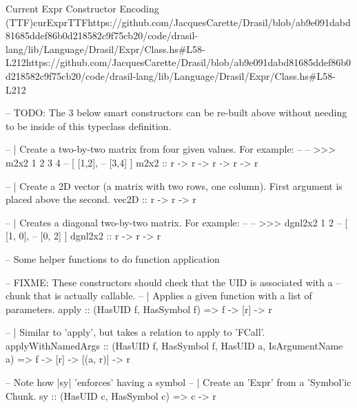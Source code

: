 \begin{haskell}{Current Expr Constructor Encoding (TTF)}{curExprTTF}{https://github.com/JacquesCarette/Drasil/blob/ab9e091dabd81685ddef86b0d218582c9f75c\newline{}b20/code/drasil-lang/lib/Language/Drasil/Expr/Class.hs\#L58-L212}{https://github.com/JacquesCarette/Drasil/blob/ab9e091dabd81685ddef86b0d218582c9f75cb20/code/drasil-lang/lib/Language/Drasil/Expr/Class.hs\#L58-L212}
  
  -- TODO: The 3 below smart constructors can be re-built above without needing to be inside of this typeclass definition.
  
  
  -- | Create a two-by-two matrix from four given values. For example:
  --
  -- >>> m2x2 1 2 3 4
  -- [ [1,2],
  --   [3,4] ]
  m2x2 :: r -> r -> r -> r -> r
  
  -- | Create a 2D vector (a matrix with two rows, one column). First argument is placed above the second.
  vec2D :: r -> r -> r
  
  -- | Creates a diagonal two-by-two matrix. For example:
  --
  -- >>> dgnl2x2 1 2
  -- [ [1, 0],
  --   [0, 2] ]
  dgnl2x2 :: r -> r -> r
  
  -- Some helper functions to do function application
  
  -- FIXME: These constructors should check that the UID is associated with a
  -- chunk that is actually callable.
  -- | Applies a given function with a list of parameters.
  apply :: (HasUID f, HasSymbol f) => f -> [r] -> r
  
  -- | Similar to 'apply', but takes a relation to apply to 'FCall'.
  applyWithNamedArgs :: (HasUID f, HasSymbol f, HasUID a, IsArgumentName a) => f 
    -> [r] -> [(a, r)] -> r
  
  -- Note how |sy| 'enforces' having a symbol
  -- | Create an 'Expr' from a 'Symbol'ic Chunk.
  sy :: (HasUID c, HasSymbol c) => c -> r
\end{haskell}
